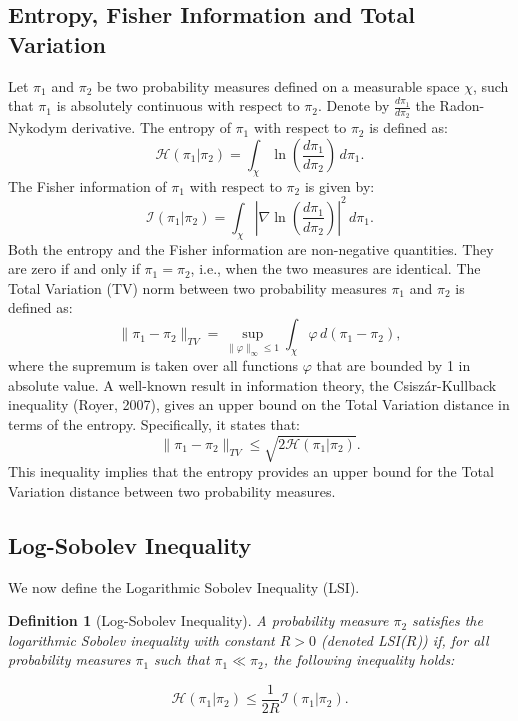 \documentclass[11pt, twoside]{report}
\newtheorem{definition}[theorem]{Definition}
\begin{document}
\subsection{Entropy, Fisher Information and Total Variation} \label{subsec:entropy_fisher}

Let $\pi_1$ and $\pi_2$ be two probability measures defined on a measurable space $\chi$, %
such that $\pi_1$ is absolutely continuous with respect to $\pi_2$. Denote by $\frac{d\pi_1}{d\pi_2}$ the Radon-Nykodym derivative. The entropy of $\pi_1$ with respect to $\pi_2$ is defined as:
\[
\mathcal{H}(\pi_1 | \pi_2) = \int_\chi \ln{\left( \frac{d\pi_1}{d\pi_2} \right)} \, d\pi_1.
\]
The Fisher information of $\pi_1$ with respect to $\pi_2$ is given by:
\[
\mathcal{I}(\pi_1 | \pi_2) = \int_\chi \left| \nabla \ln{\left( \frac{d\pi_1}{d\pi_2} \right)} \right|^2 \, d\pi_1.
\]
Both the entropy and the Fisher information are non-negative quantities. They are zero if and only if $\pi_1 = \pi_2$, i.e., when the two measures are identical. The Total Variation (TV) norm between two probability measures $\pi_1$ and $\pi_2$ is defined as:
\[
\|\pi_1 - \pi_2\|_{TV} = \sup_{\|\varphi\|_{\infty} \leq 1} \int_\chi \varphi \, d(\pi_1 - \pi_2),
\]
where the supremum is taken over all functions $\varphi$ that are bounded by 1 in absolute value. A well-known result in information theory, the Csisz\'{a}r-Kullback inequality (Royer, 2007), gives an upper bound on the Total Variation distance in terms of the entropy. Specifically, it states that:
\[
\|\pi_1 - \pi_2\|_{TV} \leq \sqrt{2\mathcal{H}(\pi_1 | \pi_2)}.
\]
This inequality implies that the entropy provides an upper bound for the Total Variation distance between two probability measures.

\subsection{Log-Sobolev Inequality}

We now define the Logarithmic Sobolev Inequality (LSI).
\begin{definition}[Log-Sobolev Inequality]
A probability measure $\pi_2$ satisfies the logarithmic Sobolev inequality with constant $R > 0$ (denoted LSI($R$)) if, for all probability measures $\pi_1$ such that $\pi_1 \ll \pi_2$, the following inequality holds:

\[
\mathcal{H}(\pi_1 | \pi_2) \leq \frac{1}{2R} \mathcal{I}(\pi_1 | \pi_2).
\]
\end{definition}
\end{document}
